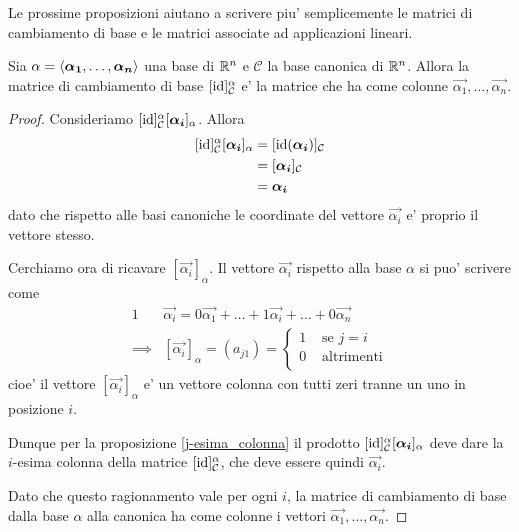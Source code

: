 Le prossime proposizioni aiutano a scrivere piu' semplicemente le matrici di cambiamento di base e le matrici associate ad applicazioni lineari.

\begin{proposition}
    Sia $\alpha = \left\langle \bm{\alpha_1}, \dots, \bm{\alpha_n} \right\rangle$ una base di $\mathbb{R}^n$ e $\mathcal{C}$ la base canonica di $\mathbb{R}^n$. Allora la matrice di cambiamento di base $[\operatorname{id}]^{\alpha}_{\mathcal{C}}$ e' la matrice che ha come colonne $\vec{\alpha_1}, \dots, \vec{\alpha_n}$.
\end{proposition}
\begin{proof}
    Consideriamo $[\operatorname{id}]^{\alpha}_{\mathcal{C}} [\bm{\alpha_i}]_{\alpha}$. Allora \begin{alignat*}
        {1}
        [\operatorname{id}]^{\alpha}_{\mathcal{C}} [\bm{\alpha_i}]_{\alpha} &= [\operatorname{id}(\bm{\alpha_i})]_{\mathcal{C}} \\
        &= [\bm{\alpha_i}]_{\mathcal{C}}\\
        &= \bm{\alpha_i}
    \end{alignat*} dato che rispetto alle basi canoniche le coordinate del vettore $\vec{\alpha_i}$ e' proprio il vettore stesso.
    
    Cerchiamo ora di ricavare $[\vec{\alpha_i}]_{\alpha}$. Il vettore $\vec{\alpha_i}$ rispetto alla base $\alpha$ si puo' scrivere come \begin{alignat*}
        {1}
        &\vec{\alpha_i} = 0\vec{\alpha_1} + \dots + 1\vec{\alpha_i} + \dots + 0\vec{\alpha_n} \\
        \implies &[\vec{\alpha_i}]_{\alpha} = (a_{j1}) = \begin{cases}
            1 & \text{ se } j = i\\
            0 & \text{ altrimenti}\\
        \end{cases}
    \end{alignat*}
    cioe' il vettore $[\vec{\alpha_i}]_{\alpha}$ e' un vettore colonna con tutti zeri tranne un uno in posizione $i$.

    Dunque per la proposizione \ref{j-esima_colonna} il prodotto $[\operatorname{id}]^{\alpha}_{\mathcal{C}} [\bm{\alpha_i}]_{\alpha}$ deve dare la $i$-esima colonna della matrice $[\operatorname{id}]^{\alpha}_{\mathcal{C}}$, che deve essere quindi $\vec{\alpha_i}$.

    Dato che questo ragionamento vale per ogni $i$, la matrice di cambiamento di base dalla base $\alpha$ alla canonica ha come colonne i vettori $\vec{\alpha_1}, \dots, \vec{\alpha_n}$.
\end{proof}
